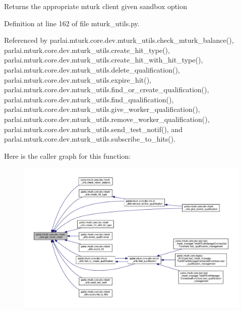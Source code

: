 \begin{DoxyVerb}Returns the appropriate mturk client given sandbox option\end{DoxyVerb}
 

Definition at line 162 of file mturk\+\_\+utils.\+py.



Referenced by parlai.\+mturk.\+core.\+dev.\+mturk\+\_\+utils.\+check\+\_\+mturk\+\_\+balance(), parlai.\+mturk.\+core.\+dev.\+mturk\+\_\+utils.\+create\+\_\+hit\+\_\+type(), parlai.\+mturk.\+core.\+dev.\+mturk\+\_\+utils.\+create\+\_\+hit\+\_\+with\+\_\+hit\+\_\+type(), parlai.\+mturk.\+core.\+dev.\+mturk\+\_\+utils.\+delete\+\_\+qualification(), parlai.\+mturk.\+core.\+dev.\+mturk\+\_\+utils.\+expire\+\_\+hit(), parlai.\+mturk.\+core.\+dev.\+mturk\+\_\+utils.\+find\+\_\+or\+\_\+create\+\_\+qualification(), parlai.\+mturk.\+core.\+dev.\+mturk\+\_\+utils.\+find\+\_\+qualification(), parlai.\+mturk.\+core.\+dev.\+mturk\+\_\+utils.\+give\+\_\+worker\+\_\+qualification(), parlai.\+mturk.\+core.\+dev.\+mturk\+\_\+utils.\+remove\+\_\+worker\+\_\+qualification(), parlai.\+mturk.\+core.\+dev.\+mturk\+\_\+utils.\+send\+\_\+test\+\_\+notif(), and parlai.\+mturk.\+core.\+dev.\+mturk\+\_\+utils.\+subscribe\+\_\+to\+\_\+hits().

Here is the caller graph for this function\+:
\nopagebreak
\begin{figure}[H]
\begin{center}
\leavevmode
\includegraphics[width=350pt]{namespaceparlai_1_1mturk_1_1core_1_1dev_1_1mturk__utils_ad9e4ecfca00663796f26ca16a2778f29_icgraph}
\end{center}
\end{figure}
\mbox{\label{namespaceparlai_1_1mturk_1_1core_1_1dev_1_1mturk__utils_a631fbce36ff4d09422f29513460bc744}} 
